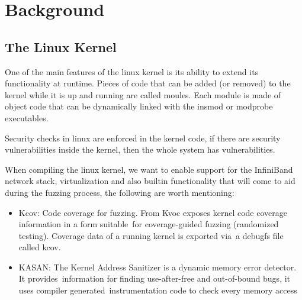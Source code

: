 \section{Background}

\subsection{The Linux Kernel}

One of the main features of the linux kernel is its ability to extend 
its functionality at runtime. Pieces of code that can be added (or removed) to the kernel 
while it is up and running are called moules. Each module is made of object code that can 
be dynamically linked with the insmod or modprobe executables\cite{ldd3}. 

Security checks in linux are enforced in the kernel code, if there are security vulnerabilities inside
the kernel, then the whole system has vulnerabilities.\cite{ldd3}




When compiling the linux kernel, we want to enable support for the InfiniBand network stack, virtualization and 
also builtin functionality that will come to aid during the fuzzing process, the following are worth
mentioning:

\begin{itemize}
    \item Kcov: Code coverage for fuzzing. From \cite{kerneldocs-kcov} Kvoc exposes kernel code coverage information in a form suitable\
    for coverage-guided fuzzing (randomized testing). Coverage data of a running kernel is exported via\
    a debugfs file called kcov. %
    \item KASAN: The Kernel Address Sanitizer is a dynamic memory error detector. It provides\
    information for finding use-after-free and out-of-bound bugs, it uses compiler generated\
    instrumentation code to check every memory access \cite{kerneldocs-kasan} %
\end{itemize}

